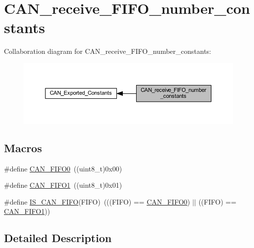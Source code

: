 \hypertarget{group___c_a_n__receive___f_i_f_o__number__constants}{}\section{C\+A\+N\+\_\+receive\+\_\+\+F\+I\+F\+O\+\_\+number\+\_\+constants}
\label{group___c_a_n__receive___f_i_f_o__number__constants}
Collaboration diagram for C\+A\+N\+\_\+receive\+\_\+\+F\+I\+F\+O\+\_\+number\+\_\+constants\+:
\nopagebreak
\begin{figure}[H]
\begin{center}
\leavevmode
\includegraphics[width=350pt]{group___c_a_n__receive___f_i_f_o__number__constants}
\end{center}
\end{figure}
\subsection*{Macros}
\begin{DoxyCompactItemize}
\item 
\#define \hyperlink{group___c_a_n__receive___f_i_f_o__number__constants_ga8f52eeefb86b2af5b7c3b4b75fa4d114}{C\+A\+N\+\_\+\+F\+I\+F\+O0}~((uint8\+\_\+t)0x00)
\item 
\#define \hyperlink{group___c_a_n__receive___f_i_f_o__number__constants_gafbcf3f13dbf61030ab7a812595ba9850}{C\+A\+N\+\_\+\+F\+I\+F\+O1}~((uint8\+\_\+t)0x01)
\item 
\#define \hyperlink{group___c_a_n__receive___f_i_f_o__number__constants_gaeeb94bf58bd48b8928f964eaaa20a24a}{I\+S\+\_\+\+C\+A\+N\+\_\+\+F\+I\+FO}(F\+I\+FO)~(((F\+I\+FO) == \hyperlink{group___c_a_n__receive___f_i_f_o__number__constants_ga8f52eeefb86b2af5b7c3b4b75fa4d114}{C\+A\+N\+\_\+\+F\+I\+F\+O0}) $\vert$$\vert$ ((F\+I\+FO) == \hyperlink{group___c_a_n__receive___f_i_f_o__number__constants_gafbcf3f13dbf61030ab7a812595ba9850}{C\+A\+N\+\_\+\+F\+I\+F\+O1}))
\end{DoxyCompactItemize}


\subsection{Detailed Description}


